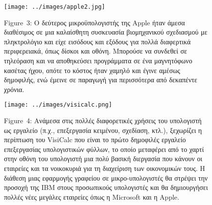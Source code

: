 \documentclass[
]{article}
\begin{document}
\leavevmode{}%
\begin{figure}
\hypertarget{fig:apple2}{%
\centering
\texttt{[image: ../images/apple2.jpg]}
\caption{Figure~3: Ο δεύτερος μικροϋπολογιστής της Apple ήταν άμεσα
διαθέσιμος σε μια καλαίσθητη συσκευασία βιομηχανικού σχεδιασμού με
πληκτρολόγιο και είχε εισόδους και εξόδους για πολλά διαφερτικά
περιφερειακά, όπως δίσκοι και οθόνη. Μπορούσε να συνδεθεί σε τηλεόραση
και να αποθηκεύσει προγράμματα σε ένα μαγνητόφωνο κασέτας ήχου, οπότε το
κόστος ήταν χαμηλό και έγινε αμέσως δημοφιλής, ενώ έμεινε σε παραγωγή
για περισσότερα από δεκαπέντε χρόνια.}\label{fig:apple2}
}
\end{figure}

\leavevmode{}%
\begin{figure}
\hypertarget{fig:visicalc}{%
\centering
\texttt{[image: ../images/visicalc.png]}
\caption{Figure~4: Ανάμεσα στις πολλές διαφορετικές χρήσεις του
υπολογιστή ως εργαλείο (π.χ., επεξεργασία κειμένου, σχεδίαση, κτλ.),
ξεχωρίζει η περίπτωση του VisiCalc που είναι το πρώτο δημοφιλές εργαλείο
επεξεργασίας υπολογιστικών φύλλων, το οποίο μεταφέρει από το χαρτί στην
οθόνη του υπολογιστή μια πολύ βασική διεργασία που κάνουν οι εταιρείες
και τα νοικοκυριά για τη διαχείριση των οικονομικών τους. Η διάθεση μιας
εφαρμογής γραφείου σε μικρο-υπολογιστές θα στρέψει την προσοχή της IBM
στους προσωπικούς υπολογιστές και θα δημιουργήσει πολλές νέες μεγάλες
εταιρείες όπως η Microsoft και η Apple.}\label{fig:visicalc}
}
\end{figure}
\end{document}

